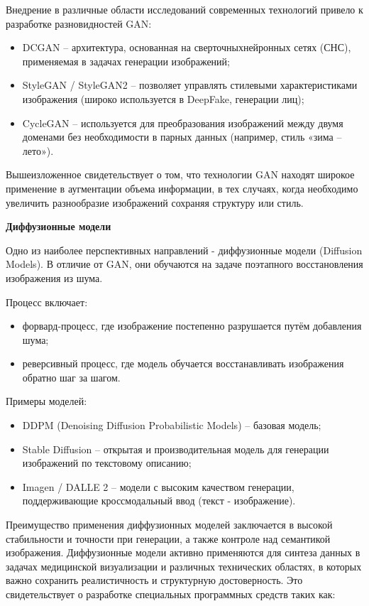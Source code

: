 Внедрение в различные области исследований современных технологий привело к разработке разновидностей GAN:
\begin{itemize}
	\item DCGAN – архитектура, основанная на сверточныхнейронных сетях (СНС), применяемая в задачах генерации изображений;
	\item StyleGAN / StyleGAN2 – позволяет управлять стилевыми характеристиками изображения (широко используется в DeepFake, генерации лиц);
	\item CycleGAN – используется для преобразования изображений между двумя доменами без необходимости в парных данных (например, стиль «зима – лето»).
\end{itemize}

Вышеизложенное свидетельствует о том, что технологии GAN находят широкое применение в аугментации объема информации, в тех случаях, когда необходимо увеличить разнообразие изображений сохраняя структуру или стиль.

\textbf{Диффузионные модели}

Одно из наиболее перспективных направлений	 - диффузионные модели (Diffusion Models). В отличие от GAN, они обучаются на задаче поэтапного восстановления изображения из шума.

Процесс включает:

\begin{itemize}
	\item форвард-процесс, где изображение постепенно разрушается путём добавления шума;
	\item реверсивный процесс, где модель обучается восстанавливать изображения обратно шаг за шагом.
\end{itemize}
Примеры моделей:

\begin{itemize}
	\item DDPM (Denoising Diffusion Probabilistic Models) – базовая модель;
	\item Stable Diffusion – открытая и производительная модель для генерации изображений по текстовому описанию;
	\item Imagen / DALLE 2 – модели с высоким качеством генерации, поддерживающие кроссмодальный ввод (текст - изображение).
\end{itemize}

Преимущество применения диффузионных моделей заключается в высокой стабильности и точности при генерации, а также контроле над семантикой изображения. Диффузионные модели активно применяются для синтеза данных в задачах медицинской визуализации и различных технических областях, в которых важно сохранить реалистичность и структурную достоверность. Это свидетельствует о разработке специальных программных средств таких как:

